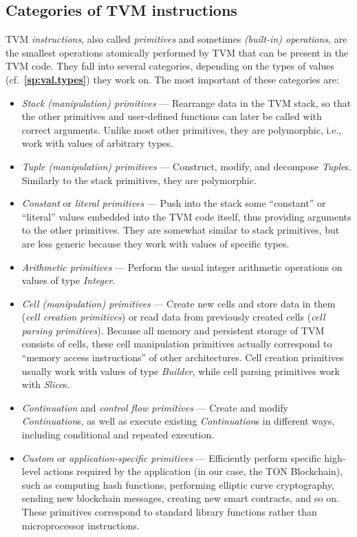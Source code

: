 \documentclass[12pt,oneside]{article}
\def\refpoint#1{{\rm\textbf{\ref{#1}}}}
\let\ptref=\refpoint
\def\mysubsection#1{\subsection{#1}\fancyhead[C]{\small{\textsc{\textrm{\thesubsection.} #1}}}}
\begin{document}
\mysubsection{Categories of TVM instructions}
TVM {\em instructions}, also called {\em primitives\/} and sometimes {\em (built-in) operations}, are the smallest operations atomically performed by TVM that can be present in the TVM code. They fall into several categories, depending on the types of values (cf.~\ptref{sp:val.types}) they work on. The most important of these categories are:
\begin{itemize}
\item {\em Stack (manipulation) primitives\/} --- Rearrange data in the TVM stack, so that the other primitives and user-defined functions can later be called with correct arguments. Unlike most other primitives, they are polymorphic, i.e., work with values of arbitrary types.
\item {\em Tuple (manipulation) primitives\/} --- Construct, modify, and decompose {\em Tuple\/}s. Similarly to the stack primitives, they are polymorphic.
\item {\em Constant\/} or {\em literal primitives\/} --- Push into the stack some ``constant'' or ``literal'' values embedded into the TVM code itself, thus providing arguments to the other primitives. They are somewhat similar to stack primitives, but are less generic because they work with values of specific types.
\item {\em Arithmetic primitives\/} --- Perform the usual integer arithmetic operations on values of type {\em Integer}.
\item {\em Cell (manipulation) primitives\/} --- Create new cells and store data in them ({\em cell creation primitives}) or read data from previously created cells ({\em cell parsing primitives}). Because all memory and persistent storage of TVM consists of cells, these cell manipulation primitives actually correspond to ``memory access instructions'' of other architectures. Cell creation primitives usually work with values of type {\em Builder}, while cell parsing primitives work with {\em Slice\/}s.
\item {\em Continuation\/} and {\em control flow primitives\/} --- Create and modify {\em Continuation\/}s, as well as execute existing {\em Continuation\/}s in different ways, including conditional and repeated execution.
\item {\em Custom\/} or {\em application-specific primitives\/} --- Efficiently perform specific high-level actions required by the application (in our case, the TON Blockchain), such as computing hash functions, performing elliptic curve cryptography, sending new blockchain messages, creating new smart contracts, and so on. These primitives correspond to standard library functions rather than microprocessor instructions.
\end{itemize}
\end{document}
